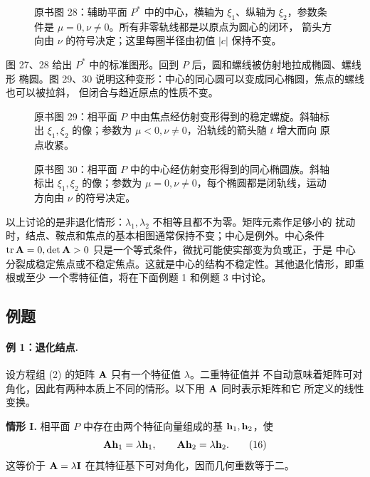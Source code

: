 \begin{figure}[H]
 \centering
 
 \caption{原书图 28：辅助平面 \(P^*\) 中的中心，横轴为 \(\xi_1\)、纵轴为
 \(\xi_2\)，参数条件是 \(\mu=0,\nu\neq0\)。所有非零轨线都是以原点为圆心的闭环，
 箭头方向由 \(\nu\) 的符号决定；这里每圈半径由初值 \(|c|\) 保持不变。}
 \label{fig:ch2-p2-28}
\end{figure}

图 27、28 给出 \(P^*\) 中的标准图形。回到 \(P\) 后，圆和螺线被仿射地拉成椭圆、螺线形
椭圆。图 29、30 说明这种变形：中心的同心圆可以变成同心椭圆，焦点的螺线也可以被拉斜，
但闭合与趋近原点的性质不变。

\begin{figure}[H]
 \centering
 
 \caption{原书图 29：相平面 \(P\) 中由焦点经仿射变形得到的稳定螺旋。斜轴标出
 \(\xi_1,\xi_2\) 的像；参数为 \(\mu<0,\nu\neq0\)，沿轨线的箭头随 \(t\) 增大而向
 原点收紧。}
 \label{fig:ch2-p2-29}
\end{figure}

\begin{figure}[H]
 \centering
 
 \caption{原书图 30：相平面 \(P\) 中的中心经仿射变形得到的同心椭圆族。斜轴标出
 \(\xi_1,\xi_2\) 的像；参数为 \(\mu=0,\nu\neq0\)，每个椭圆都是闭轨线，运动方向由
 \(\nu\) 的符号决定。}
 \label{fig:ch2-p2-30}
\end{figure}

以上讨论的是非退化情形：\(\lambda_1,\lambda_2\) 不相等且都不为零。矩阵元素作足够小的
扰动时，结点、鞍点和焦点的基本相图通常保持不变；中心是例外。中心条件
\(\operatorname{tr}\mathbf{A}=0,\det \mathbf{A}>0\) 只是一个等式条件，微扰可能使实部变为负或正，于是
中心分裂成稳定焦点或不稳定焦点。这就是中心的结构不稳定性。其他退化情形，即重根或至少
一个零特征值，将在下面例题 1 和例题 3 中讨论。

\subsection*{例题}

\paragraph{例 1：退化结点.}
设方程组 (2) 的矩阵 \(\mathbf{A}\) 只有一个特征值 \(\lambda\)。二重特征值并
不自动意味着矩阵可对角化，因此有两种本质上不同的情形。以下用 \(\mathbf{A}\) 同时表示矩阵和它
所定义的线性变换。

\medskip
\noindent\textbf{情形 I.}
相平面 \(P\) 中存在由两个特征向量组成的基 \(\vect{h}_1,\vect{h}_2\)，使
\begin{equation}
 \mat{A}\vect{h}_1=\lambda \vect{h}_1,\qquad
 \mat{A}\vect{h}_2=\lambda \vect{h}_2.
 \tag{16}
\end{equation}
这等价于 \(\mathbf{A}=\lambda \mathbf{I}\) 在其特征基下可对角化，因而几何重数等于二。

